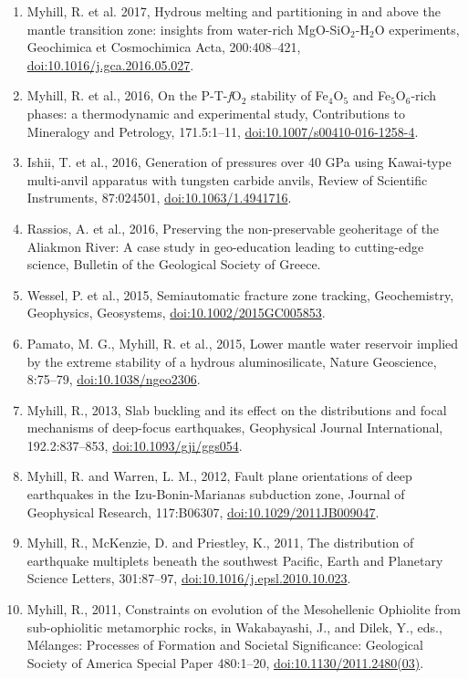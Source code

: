 \documentclass[11pt,twoside,a4paper]{article}
\newcommand{\doi}[1]{\href{http://dx.doi.org/#1}{doi:#1}}
\begin{document}
\begin{enumerate}
\item Myhill, R. et al. 2017, Hydrous melting and partitioning in and above the mantle transition zone: insights from water-rich MgO-SiO$_2$-H$_2$O experiments, Geochimica et Cosmochimica Acta, 200:408--421, \doi{10.1016/j.gca.2016.05.027}.
\item Myhill, R. et al., 2016, On the P-T-\emph{f}O$_2$ stability of Fe$_4$O$_5$ and Fe$_5$O$_6$-rich phases: a thermodynamic and experimental study, Contributions to Mineralogy and Petrology, 171.5:1--11, \doi{10.1007/s00410-016-1258-4}.
 \item Ishii, T. et al., 2016, Generation of pressures over 40 GPa using Kawai-type multi-anvil apparatus with tungsten carbide anvils, Review of Scientific Instruments, 87:024501, \doi{10.1063/1.4941716}.
 \item Rassios, A. et al., 2016, Preserving the non-preservable geoheritage of the Aliakmon River: A case study in geo-education leading to cutting-edge science, Bulletin of the Geological Society of Greece.
\item  Wessel, P. et al., 2015, Semiautomatic fracture zone tracking, Geochemistry, Geophysics, Geosystems, \doi{10.1002/2015GC005853}.
\item Pamato, M. G., Myhill, R. et al., 2015, Lower mantle water reservoir implied by the extreme stability of a hydrous aluminosilicate, Nature Geoscience, 8:75--79, \doi{10.1038/ngeo2306}.
\item Myhill, R., 2013, Slab buckling and its effect on the distributions and focal mechanisms of deep-focus earthquakes, Geophysical Journal International, 192.2:837--853, \doi{10.1093/gji/ggs054}.
\item Myhill, R. and Warren, L. M., 2012, Fault plane orientations of deep earthquakes in the Izu-Bonin-Marianas subduction zone, Journal of Geophysical Research, 117:B06307, \doi{10.1029/2011JB009047}.
\item Myhill, R., McKenzie, D. and Priestley, K., 2011, The distribution of earthquake multiplets beneath the southwest Pacific, Earth and Planetary Science Letters, 301:87--97, \doi{10.1016/j.epsl.2010.10.023}.
\item Myhill, R., 2011, Constraints on evolution of the Mesohellenic Ophiolite from sub-ophiolitic metamorphic rocks, in Wakabayashi, J., and Dilek, Y., eds., M\'elanges: Processes of Formation and Societal Significance: Geological Society of America Special Paper 480:1--20, \doi{10.1130/2011.2480(03)}.
\end{enumerate}
\end{document}
